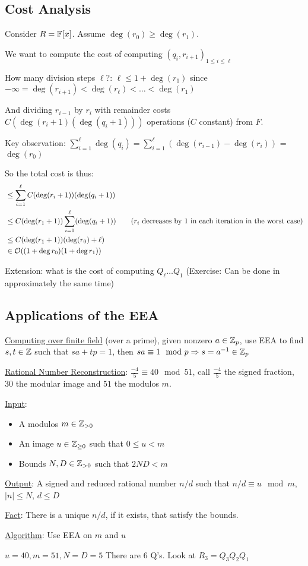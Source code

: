 \subsection{Cost Analysis}
Consider $R = \operatorname{\mathbb{F}}[x]$. Assume $\deg(r_0) \geq \deg(r_1)$.

We want to compute the cost of computing $(q_i, r_{i+1})_{1 \leq i \leq \ell}$

How many division steps $\ell$?: $\ell \leq 1 + \deg(r_1)$ since $-\infty = \deg(r_{i+1}) < \deg(r_\ell) < \ldots < \deg(r_1)$

And dividing $r_{i-1}$ by $r_i$ with remainder costs $C(\deg(r_i + 1)(\deg(q_i + 1)))$ operations ($C$ constant) from $F$.

Key observation: $\sum_{i = 1}^\ell \deg(q_i) = \sum_{i =1}^\ell \left(\deg(r_{i -1}) - \deg(r_i) \right)$ = $\deg(r_0)$

So the total cost is thus: 
\begin{align*}
    &\leq \sum_{i=1}^\ell C(\deg(r_i + 1))(\deg(q_i + 1)) \\
    &\leq C(\deg(r_1 + 1))\sum_{i=1}^\ell (\deg(q_i +1)) \quad &(r_i \text{ decreases by 1 in each iteration in the worst case}) \\
    &\leq C(\deg(r_1 + 1))(\deg(r_0) + \ell) \\
    &\in \operatorname{\mathcal{O}}((1 + \deg r_0)(1 + \deg r_1))
\end{align*}

Extension: what is the cost of computing $Q_\ell \ldots Q_1$ (Exercise: Can be done in approximately the same time)

\subsection{Applications of the EEA}
\ul{Computing over finite field} (over a prime), given nonzero $a \in \operatorname{\mathbb{Z}}_p$, use EEA to find $s,t \in \operatorname{\mathbb{Z}}$ such that $sa + tp = 1$, then $sa \equiv 1 \mod p \Rightarrow s = a^{-1} \in \operatorname{\mathbb{Z}}_p$


\ul{Rational Number Reconstruction}:
$\frac{-4}{5} \equiv 40 \mod 51$, call $\frac{-4}{5}$ the signed fraction, $30$ the modular image and $51$ the modulos $m$.

\ul{Input}:
\begin{itemize}
    \item A modulos $m \in \operatorname{\mathbb{Z}}_{> 0}$
    \item An image $u \in \operatorname{\mathbb{Z}}_{\geq 0}$ such that $0 \leq u < m$
    \item Bounds $N, D \in \operatorname{\mathbb{Z}}_{> 0}$ such that $2ND < m$
\end{itemize}

\ul{Output}: A signed and reduced rational number $n/d$ such that $n/d \equiv u \mod m$, $|n| \leq N$, $d \leq D$

\ul{Fact}: There is a unique $n/d$, if it exists, that satisfy the bounds.

\ul{Algorithm}: Use EEA on $m$ and $u$ 
\begin{example}{}{}
    $u = 40, m = 51, N = D = 5$
    There are $6$ Q's. Look at $R_3 = Q_3Q_2Q_1$

\end{example}